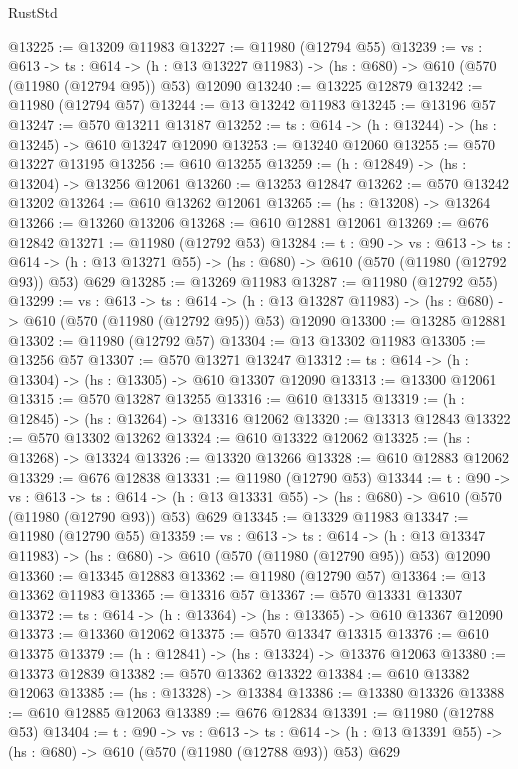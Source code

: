 \begin{lexlean}{RustStd}
\begin{coremodule}
@13225 := @13209 @11983
@13227 := @11980 (@12794 @55)
@13239 := {vs : @613} ->
  {ts : @614} ->
  (h : @13 @13227 @11983) -> (hs : @680) -> @610 (@570 (@11980 (@12794 @95)) @53) @12090
@13240 := @13225 @12879
@13242 := @11980 (@12794 @57)
@13244 := @13 @13242 @11983
@13245 := @13196 @57
@13247 := @570 @13211 @13187
@13252 := {ts : @614} -> (h : @13244) -> (hs : @13245) -> @610 @13247 @12090
@13253 := @13240 @12060
@13255 := @570 @13227 @13195
@13256 := @610 @13255
@13259 := (h : @12849) -> (hs : @13204) -> @13256 @12061
@13260 := @13253 @12847
@13262 := @570 @13242 @13202
@13264 := @610 @13262 @12061
@13265 := (hs : @13208) -> @13264
@13266 := @13260 @13206
@13268 := @610 @12881 @12061
@13269 := @676 @12842
@13271 := @11980 (@12792 @53)
@13284 := {t : @90} ->
  {vs : @613} ->
  {ts : @614} -> (h : @13 @13271 @55) -> (hs : @680) -> @610 (@570 (@11980 (@12792 @93)) @53) @629
@13285 := @13269 @11983
@13287 := @11980 (@12792 @55)
@13299 := {vs : @613} ->
  {ts : @614} ->
  (h : @13 @13287 @11983) -> (hs : @680) -> @610 (@570 (@11980 (@12792 @95)) @53) @12090
@13300 := @13285 @12881
@13302 := @11980 (@12792 @57)
@13304 := @13 @13302 @11983
@13305 := @13256 @57
@13307 := @570 @13271 @13247
@13312 := {ts : @614} -> (h : @13304) -> (hs : @13305) -> @610 @13307 @12090
@13313 := @13300 @12061
@13315 := @570 @13287 @13255
@13316 := @610 @13315
@13319 := (h : @12845) -> (hs : @13264) -> @13316 @12062
@13320 := @13313 @12843
@13322 := @570 @13302 @13262
@13324 := @610 @13322 @12062
@13325 := (hs : @13268) -> @13324
@13326 := @13320 @13266
@13328 := @610 @12883 @12062
@13329 := @676 @12838
@13331 := @11980 (@12790 @53)
@13344 := {t : @90} ->
  {vs : @613} ->
  {ts : @614} -> (h : @13 @13331 @55) -> (hs : @680) -> @610 (@570 (@11980 (@12790 @93)) @53) @629
@13345 := @13329 @11983
@13347 := @11980 (@12790 @55)
@13359 := {vs : @613} ->
  {ts : @614} ->
  (h : @13 @13347 @11983) -> (hs : @680) -> @610 (@570 (@11980 (@12790 @95)) @53) @12090
@13360 := @13345 @12883
@13362 := @11980 (@12790 @57)
@13364 := @13 @13362 @11983
@13365 := @13316 @57
@13367 := @570 @13331 @13307
@13372 := {ts : @614} -> (h : @13364) -> (hs : @13365) -> @610 @13367 @12090
@13373 := @13360 @12062
@13375 := @570 @13347 @13315
@13376 := @610 @13375
@13379 := (h : @12841) -> (hs : @13324) -> @13376 @12063
@13380 := @13373 @12839
@13382 := @570 @13362 @13322
@13384 := @610 @13382 @12063
@13385 := (hs : @13328) -> @13384
@13386 := @13380 @13326
@13388 := @610 @12885 @12063
@13389 := @676 @12834
@13391 := @11980 (@12788 @53)
@13404 := {t : @90} ->
  {vs : @613} ->
  {ts : @614} -> (h : @13 @13391 @55) -> (hs : @680) -> @610 (@570 (@11980 (@12788 @93)) @53) @629

\end{coremodule}
\end{lexlean}
